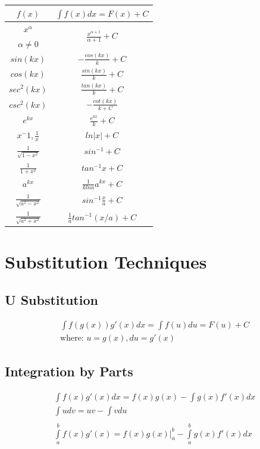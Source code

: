 \documentclass[12pt, letterpaper]{article}
\begin{document}
\begin{multicols}{2}
\begin{center}
\begin{tabular}{|c|c|}
\hline
$f(x)$ & $\int\limits f(x) dx = F(x) + C $\\
\hline
$x^\alpha$ & \multirow{2}{4em}{$\frac{x^{\alpha + 1}}{\alpha + 1} + C$}\\
  $\alpha \neq 0$ &\\
\hline
$sin(kx)$ & $-\frac{cos(kx)}{k} + C$\\
\hline
$cos(kx)$ & $\frac{sin(kx)}{k} + C$\\
\hline
$sec^2(kx)$ & $\frac{tan(kx)}{k} + C$\\
\hline
$csc^2(kx)$ & $-\frac{cot(kx)}{k+C}$\\
\hline
$e^{kx}$ & $\frac{e^{kx}}{k} + C$\\
\hline
$x^-1 , \frac{1}{x}$ & $ln|x| + C$\\
\hline
$\frac{1}{\sqrt{1-x^2}}$ & $sin^{-1} + C$\\
\hline
$\frac{1}{1+x^2}$ & $tan^{-1}x + C$\\
\hline
$a^{kx}$ & $\frac{1}{k ln a} a^{kx} + C$\\
\hline
$\frac{1}{\sqrt{a^2-x^2}}$ & $sin^{-1} \frac{x}{a} + C$\\
\hline
$\frac{1}{\sqrt{a^2 + x^2}}$ & $\frac{1}{a} tan^{-1}(x/a) + C$\\
\hline
\end{tabular}
\end{center}

\end{multicols}

\section{Substitution Techniques}

\begin{multicols}{2}
\subsection{U Substitution}
\begin{gather*}
  \int\limits f(g(x)) g'(x) dx = \int\limits f(u) du = F(u) + C\\
  \text{where: } u = g(x), du =g'(x)
\end{gather*}
\hfill

\columnbreak

\subsection{Integration by Parts}
\begin{gather*}
  \int\limits f(x) g'(x) dx = f(x) g(x) - \int\limits g(x) f'(x) dx\\
  \int\limits u dv = u v - \int\limits v du\\
  \\
  \int\limits _a^b f(x)g'(x) = f(x)g(x) \Big| _a^b - \int\limits _a^b g(x)f'(x) dx
\end{gather*}
\end{multicols}
\end{document}
